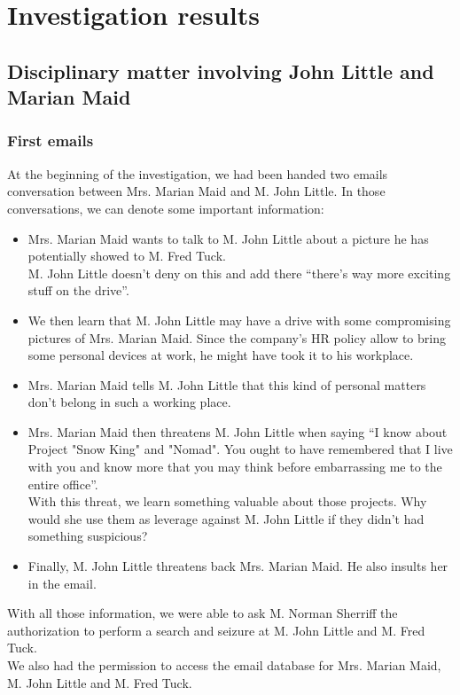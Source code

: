 \section{Investigation results}
\subsection{Disciplinary matter involving John Little and Marian Maid}
\subsubsection{First emails}
At the beginning of the investigation, we had been handed two emails conversation between Mrs. Marian Maid and M. John Little. In those conversations, we can denote some important information:
\begin{itemize}
 \item Mrs. Marian Maid wants to talk to M. John Little about a picture he has potentially showed to M. Fred Tuck.\\ M. John Little doesn't deny on this and add there \enquote{there's way more exciting stuff on the drive}.
 \item We then learn that M. John Little may have a drive with some compromising pictures of Mrs. Marian Maid. Since the company's HR policy allow to bring some personal devices at work, he might have took it to his workplace.
 \item Mrs. Marian Maid tells M. John Little that this kind of personal matters don't belong in such a working place.
 \item Mrs. Marian Maid then threatens M. John Little when saying \enquote{I know about Project "Snow King" and "Nomad". You ought to have remembered that I live with you and know more that you may think before embarrassing me to the entire office}.\\
 With this threat, we learn something valuable about those projects. Why would she use them as leverage against M. John Little if they didn't had something suspicious?
 \item Finally, M. John Little threatens back Mrs. Marian Maid. He also insults her in the email.
\end{itemize}
With all those information, we were able to ask M. Norman Sherriff the authorization to perform a search and seizure at M. John Little and M. Fred Tuck.\\
We also had the permission to access the email database for Mrs. Marian Maid, M. John Little and M. Fred Tuck.

